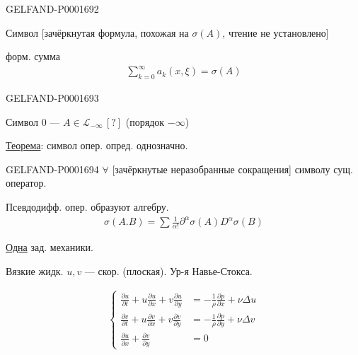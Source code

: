 \begin{GelfandAdjacentEvidence}{GELFAND-P000169}{2}

Символ [зачёркнутая формула, похожая на $\sigma(A)$, чтение не установлено]
\end{GelfandAdjacentEvidence}

форм. сумма
\begin{gather*}
\sum_{k=0}^{\infty}a_k(x,\xi)=\sigma(A)
\end{gather*}

\begin{GelfandAdjacentEvidence}{GELFAND-P000169}{3}

Символ $0$ — $A\in\mathcal{L}_{-\infty}\,[?]$ (порядок $-\infty$)
\end{GelfandAdjacentEvidence}


\underline{Теорема}: символ опер. опред. однозначно.

\begin{GelfandAdjacentEvidence}{GELFAND-P000169}{4}
$\forall$ [зачёркнутые неразобранные сокращения] символу сущ. оператор.
\end{GelfandAdjacentEvidence}


Псевдодифф. опер. образуют алгебру.
\begin{gather*}
\sigma(A.B)=\sum\frac{1}{\alpha!}
\partial^\alpha\sigma(A)D^\alpha\sigma(B)
\end{gather*}



\underline{Одна}  зад. механики.

Вязкие жидк. $u,v$ — скор. (плоская). Ур-я Навье-Стокса.

\begin{gather*}
\left\{\begin{aligned}
\frac{\partial u}{\partial t}+u\frac{\partial u}{\partial x}
+v\frac{\partial u}{\partial y}
&=-\frac{1}{\rho}\frac{\partial p}{\partial x}+\nu\Delta u\\
\frac{\partial v}{\partial t}+u\frac{\partial v}{\partial x}
+v\frac{\partial v}{\partial y}
&=-\frac{1}{\rho}\frac{\partial p}{\partial y}+\nu\Delta v\\
\frac{\partial u}{\partial x}+\frac{\partial v}{\partial y}&=0
\end{aligned}\right.
\end{gather*}


